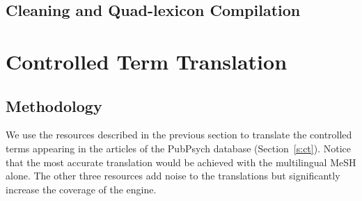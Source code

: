\documentclass[a4paper,11pt]{article}
\begin{document}
	
	\subsection{Cleaning and Quad-lexicon Compilation}
	\label{ss:cleaning}

		
	\section{Controlled Term Translation}
	\label{s:cttrad}
	
	\subsection{Methodology}
	We use the resources described in the previous section to translate the controlled terms appearing in the articles of the PubPsych database (Section~\ref{s:ct}).
	Notice that the most accurate translation would be achieved with the multilingual MeSH alone. The other three resources add noise to the translations but significantly increase the coverage of the engine.
	
\end{document}
